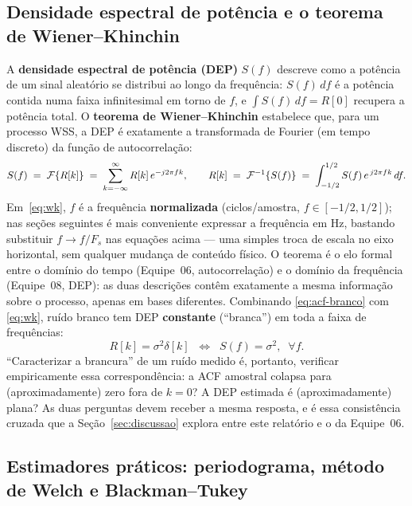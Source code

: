 \subsection{Densidade espectral de potência e o teorema de Wiener--Khinchin}
\label{sec:wk-teoria}

A \textbf{densidade espectral de potência (DEP)} $S(f)$ descreve como a potência de um sinal
aleatório se distribui ao longo da frequência: $S(f)\,df$ é a potência contida numa faixa
infinitesimal em torno de $f$, e $\int S(f)\,df = R[0]$ recupera a potência total. O
\textbf{teorema de Wiener--Khinchin} estabelece que, para um processo WSS, a DEP é exatamente a
transformada de Fourier (em tempo discreto) da função de autocorrelação:
\begin{equation}
S(f) \;=\; \mathcal{F}\{R[k]\} \;=\; \sum_{k=-\infty}^{\infty} R[k]\,e^{-j2\pi f k},
\qquad
R[k] \;=\; \mathcal{F}^{-1}\{S(f)\} \;=\; \int_{-1/2}^{1/2} S(f)\,e^{\,j2\pi f k}\,df .
\label{eq:wk}
\end{equation}
Em~\eqref{eq:wk}, $f$ é a frequência \textbf{normalizada} (ciclos/amostra, $f\in[-1/2,1/2]$); nas
seções seguintes é mais conveniente expressar a frequência em Hz, bastando substituir
$f \to f/F_s$ nas equações acima --- uma simples troca de escala no eixo horizontal, sem qualquer
mudança de conteúdo físico. O teorema é o elo formal entre o domínio do tempo (Equipe~06, autocorrelação) e o domínio da
frequência (Equipe~08, DEP): as duas descrições contêm exatamente a mesma informação sobre o
processo, apenas em bases diferentes. Combinando \eqref{eq:acf-branco} com \eqref{eq:wk},
ruído branco tem DEP \textbf{constante} (``branca'') em toda a faixa de frequências:
\begin{equation}
R[k]=\sigma^2\delta[k] \;\; \Longleftrightarrow \;\; S(f) = \sigma^2, \;\; \forall f.
\label{eq:branco-plano}
\end{equation}
``Caracterizar a brancura'' de um ruído medido é, portanto, verificar empiricamente essa
correspondência: a ACF amostral colapsa para (aproximadamente) zero fora de $k=0$? A DEP
estimada é (aproximadamente) plana? As duas perguntas devem receber a mesma resposta, e é essa
consistência cruzada que a Seção~\ref{sec:discussao} explora entre este relatório e o da
Equipe~06.

\subsection{Estimadores práticos: periodograma, método de Welch e Blackman--Tukey}
\label{sec:estimadores-teoria}

